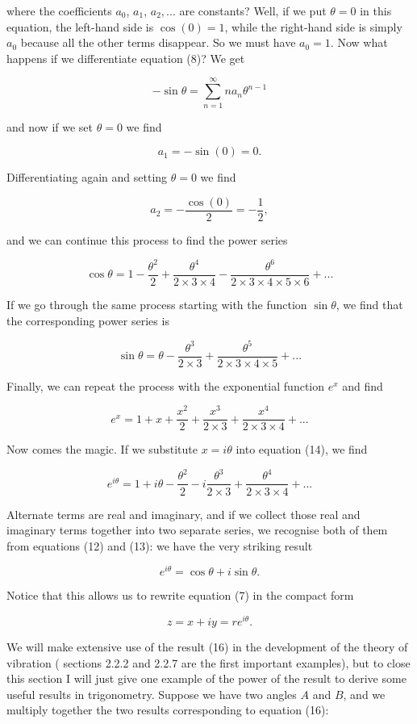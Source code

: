   where the coefficients $a_0$, $a_1$, $a_2,...$ are constants? Well, if we put 
  $\theta =0$ in this equation, the left-hand side is $\cos(0)=1$, while the 
  right-hand side is simply $a_0$ because all the other terms disappear. So we 
  must have $a_0=1$. Now what happens if we differentiate equation (8)? We get 

  $$-\sin \theta = \sum_{n=1}^\infty{n a_n \theta^{n-1}} \tag{9}$$ 

  and now if we set $\theta=0$ we find 

  $$a_1 = -\sin(0)=0. \tag{10}$$ 

  Differentiating again and setting $\theta=0$ we find 

  $$a_2 = -\dfrac{\cos(0)}{2} = -\dfrac{1}{2}, \tag{11}$$ 

  and we can continue this process to find the power series 

  $$\cos \theta = 1-\dfrac{\theta^2}{2}+\dfrac{\theta^4}{2 \times 3 \times 
  4}-\dfrac{\theta^6}{2 \times 3 \times 4 \times 5 \times 6} +...\tag{12}$$ 

  If we go through the same process starting with the function $\sin \theta$, 
  we find that the corresponding power series is 

  $$\sin \theta = \theta -\dfrac{\theta^3}{2 \times 3} + \dfrac{\theta^5}{2 
  \times 3 \times 4 \times 5}+... \tag{13}$$ 

  Finally, we can repeat the process with the exponential function $e^x$ and 
  find 

  $$e^x = 1+x+\dfrac{x^2}{2}+\dfrac{x^3}{2 \times 3}+\dfrac{x^4}{2 \times 3 
  \times 4}+... \tag{14}$$ 

  Now comes the magic. If we substitute $x=i\theta$ into equation (14), we find 

  $$e^{i \theta} = 1+i \theta-\dfrac{\theta^2}{2}-i\dfrac{\theta^3}{2 \times 
  3}+\dfrac{\theta^4}{2 \times 3 \times 4}+... \tag{15}$$ 

  Alternate terms are real and imaginary, and if we collect those real and 
  imaginary terms together into two separate series, we recognise both of them 
  from equations (12) and (13): we have the very striking result 

  $$e^{i \theta} = \cos \theta + i \sin \theta . \tag{16}$$ 

  Notice that this allows us to rewrite equation (7) in the compact form 

  $$z=x+iy=r e^{i \theta}. \tag{17}$$ 

  We will make extensive use of the result (16) in the development of the 
  theory of vibration ( sections 2.2.2 and 2.2.7 are the first important 
  examples), but to close this section I will just give one example of the 
  power of the result to derive some useful results in trigonometry. Suppose we 
  have two angles $A$ and $B$, and we multiply together the two results 
  corresponding to equation (16): 

